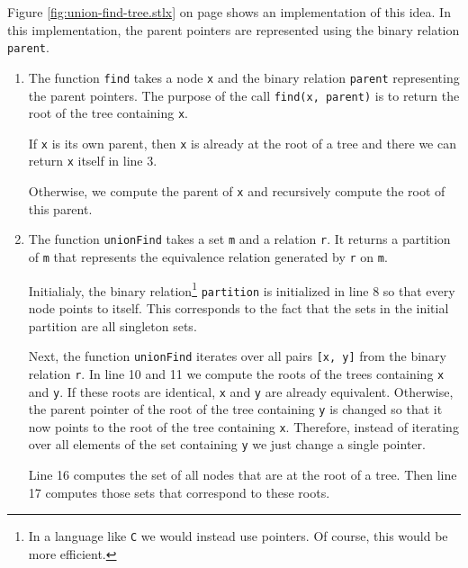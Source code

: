 Figure \ref{fig:union-find-tree.stlx} on page \pageref{fig:union-find-tree.stlx} shows an
implementation of this idea.  In this implementation, the parent pointers are represented using the
binary relation \texttt{parent}.  
\begin{enumerate}
\item The function \texttt{find} takes a node \texttt{x} and the binary relation \texttt{parent} 
      representing the parent pointers.  The purpose of the call \texttt{find(x, parent)} is to
      return the root of the tree containing \texttt{x}.

      If \texttt{x} is its own parent, then \texttt{x} is already at the root of a tree and there 
      we can return \texttt{x} itself in line 3.

      Otherwise, we compute the parent of \texttt{x} and recursively compute the root of this parent.
\item The function \texttt{unionFind} takes a set \texttt{m} and a relation \texttt{r}.  It returns
      a partition of \texttt{m} that represents the equivalence relation generated by \texttt{r} on
      \texttt{m}.

      Initialialy, the binary relation\footnote{
        In a language like \texttt{C} we would instead use pointers.  Of course, this would be more efficient.
      } \texttt{partition} is initialized in line 8 so that every node
      points to itself.   This corresponds to the fact that the sets in the initial partition are all
      singleton sets.  

      Next, the function \texttt{unionFind} iterates over all pairs \texttt{[x, y]} from the binary
      relation \texttt{r}.  In line 10 and 11 we compute the roots of the trees containing \texttt{x} and
      \texttt{y}.  If these roots are identical, \texttt{x} and \texttt{y} are already equivalent.
      Otherwise, the parent pointer of the root of the tree containing \texttt{y} is changed so that it
      now points to the root of the tree containing \texttt{x}.  Therefore, instead of iterating over all
      elements of the set containing \texttt{y} we just change a single pointer.

      Line 16 computes the set of all nodes that are at the root of a tree.  Then line 17 computes
      those sets that correspond to these roots.
\end{enumerate}

